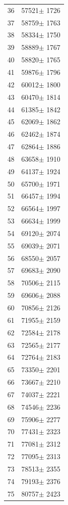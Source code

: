 \documentclass[a4paper]{instrumentacao}
\begin{document}
\begin{longtable}{cc}
 36 & 57521$\pm$ 1726 \\
 37 & 58759$\pm$ 1763 \\
 38 & 58334$\pm$ 1750 \\
 39 & 58889$\pm$ 1767 \\
 40 & 58820$\pm$ 1765 \\
 41 & 59876$\pm$ 1796 \\
 42 & 60012$\pm$ 1800 \\
 43 & 60470$\pm$ 1814 \\
 44 & 61385$\pm$ 1842 \\
 45 & 62069$\pm$ 1862 \\
 46 & 62462$\pm$ 1874 \\
 47 & 62864$\pm$ 1886 \\
 48 & 63658$\pm$ 1910 \\
 49 & 64137$\pm$ 1924 \\
 50 & 65700$\pm$ 1971 \\
 51 & 66457$\pm$ 1994 \\
 52 & 66564$\pm$ 1997 \\
 53 & 66634$\pm$ 1999 \\
 54 & 69120$\pm$ 2074 \\
 55 & 69039$\pm$ 2071 \\
 56 & 68550$\pm$ 2057 \\
 57 & 69683$\pm$ 2090 \\
 58 & 70506$\pm$ 2115 \\
 59 & 69606$\pm$ 2088 \\
 60 & 70856$\pm$ 2126 \\
 61 & 71955$\pm$ 2159 \\
 62 & 72584$\pm$ 2178 \\
 63 & 72565$\pm$ 2177 \\
 64 & 72764$\pm$ 2183 \\
 65 & 73350$\pm$ 2201 \\
 66 & 73667$\pm$ 2210 \\
 67 & 74037$\pm$ 2221 \\
 68 & 74546$\pm$ 2236 \\
 69 & 75906$\pm$ 2277 \\
 70 & 77431$\pm$ 2323 \\
 71 & 77081$\pm$ 2312 \\
 72 & 77095$\pm$ 2313 \\
 73 & 78513$\pm$ 2355 \\
 74 & 79193$\pm$ 2376 \\
 75 & 80757$\pm$ 2423 \\

\end{longtable}
\end{document}
